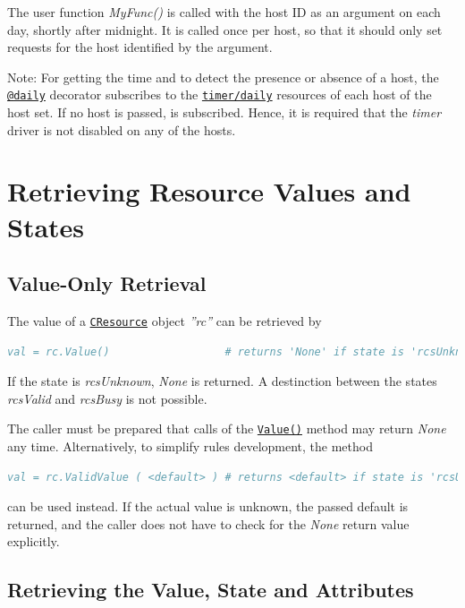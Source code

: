 \documentclass[12pt,english,parskip=half,headheight=19pt]{scrreprt}
\newcommand{\refrc}[1]{\hyperref[rc:#1]{\texttt{#1}}}
\newcommand{\refapipython}[1]{\href{home2l-api_python/index.html}{\mbox{\texttt{#1}}}}  %
\begin{document}
The user function \textit{MyFunc()} is called with the host ID as an argument on each day, shortly after midnight. It is called once per host, so that it should only set requests for the host identified by the argument.

Note: For getting the time and to detect the presence or absence of a host, the \refapipython{@daily} decorator subscribes to the \refrc{timer/daily} resources of each host of the host set. If no host is passed,  is subscribed. Hence, it is required that the \textit{timer} driver is not disabled on any of the hosts.





\section{Retrieving Resource Values and States}
\label{sec:rules-values}



\subsection{Value-Only Retrieval}

The value of a \refapipython{CResource} object \textit{''rc''} can be retrieved by
\begin{lstlisting}[language=comments]
val = rc.Value()                  # returns 'None' if state is 'rcsUnknown'
\end{lstlisting}

If the state is \textit{rcsUnknown}, \textit{None} is returned. A destinction between the states \textit{rcsValid} and \textit{rcsBusy} is not possible.

The caller must be prepared that calls of the \refapipython{Value()} method may return \textit{None} any time.
Alternatively, to simplify rules development, the method
\begin{lstlisting}[language=comments]
val = rc.ValidValue ( <default> ) # returns <default> if state is 'rcsUnknown'
\end{lstlisting}
can be used instead. If the actual value is unknown, the passed default is returned, and the caller does not have to check for the \textit{None} return value explicitly.



\subsection{Retrieving the Value, State and Attributes}
\end{document}
